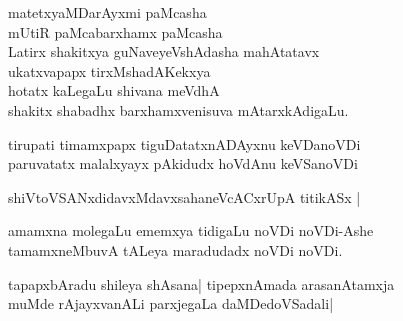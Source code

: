 \begin{entry}
\begin{shl}
matetxyaMDarAyxmi paMcasha\\
mUtiR paMcabarxhamx paMcasha\\
Latirx shakitxya guNaveyeVshAdasha mahAtatavx\\
ukatxvapapx tirxMshadAKekxya\\
hotatx kaLegaLu shivana meVdhA\\
shakitx shabadhx barxhamxvenisuva mAtarxkAdigaLu.
\end{shl}
\end{entry}

\begin{entry}
\begin{shl}
tirupati timamxpapx tiguDatatxnADAyxnu keVDanoVDi\\
paruvatatx malalxyayx pAkidudx hoVdAnu keVSanoVDi
\end{shl}
\end{entry}

\begin{entry}
\begin{shl}
shiVtoVSANxdidavxMdavxsahaneVcACxrUpA titikASx |
\end{shl}
\end{entry}

\begin{entry}
\begin{shl}
amamxna molegaLu ememxya tidigaLu noVDi noVDi-Ashe\\
tamamxneMbuvA tALeya maradudadx noVDi noVDi.
\end{shl}
\end{entry}

\begin{entry}
\begin{shl}
tapapxbAradu shileya shAsana| tipepxnAmada arasanAtamxja\\
muMde rAjayxvanALi parxjegaLa daMDedoVSadali|
\end{shl}
\end{entry}

